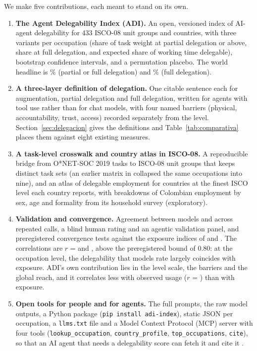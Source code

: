 We make five contributions, each meant to stand on its own.
\begin{enumerate}
  \item \textbf{The Agent Delegability Index (ADI).} An open, versioned index of AI-agent delegability for 433 ISCO-08 unit groups and  countries, with three variants per occupation (share of task weight at partial delegation or above, share at full delegation, and expected share of working time delegable), bootstrap confidence intervals, and a permutation placebo. The world headline is \% (partial or full delegation) and \% (full delegation).
  \item \textbf{A three-layer definition of delegation.} One citable sentence each for augmentation, partial delegation and full delegation, written for agents with tool use rather than for chat models, with four named barriers (physical, accountability, trust, access) recorded separately from the level. Section~\ref{sec:delegacion} gives the definitions and Table~\ref{tab:comparativa} places them against eight existing measures.
  \item \textbf{A task-level crosswalk and country atlas in ISCO-08.} A reproducible bridge from O*NET-SOC 2019 tasks to ISCO-08 unit groups that keeps  distinct task sets (an earlier matrix in \trabajoprevio collapsed the same occupations into nine), and an atlas of delegable employment for  countries at the finest ISCO level each country reports, with breakdowns of Colombian employment by sex, age and formality from its household survey (exploratory).
  \item \textbf{Validation and convergence.} Agreement between models and across repeated calls, a blind human rating and an agentic validation panel, and preregistered convergence tests against the exposure indices of \citet{eloundou2024gpts} and \citet{felten2021occupational}. The correlations are $r$ =  and , above the preregistered bound of 0.80: at the occupation level, the delegability that models rate largely coincides with exposure. ADI's own contribution lies in the level scale, the barriers and the global reach, and it correlates less with observed usage ($r$ = ) than with exposure.
  \item \textbf{Open tools for people and for agents.} The full prompts, the raw model outputs, a Python package (\texttt{pip install adi-index}), static JSON per occupation, a \texttt{llms.txt} file and a Model Context Protocol (MCP) server with four tools (\texttt{lookup\_occupation}, \texttt{country\_profile}, \texttt{top\_occupations}, \texttt{cite}), so that an AI agent that needs a delegability score can fetch it and cite it .
\end{enumerate}

